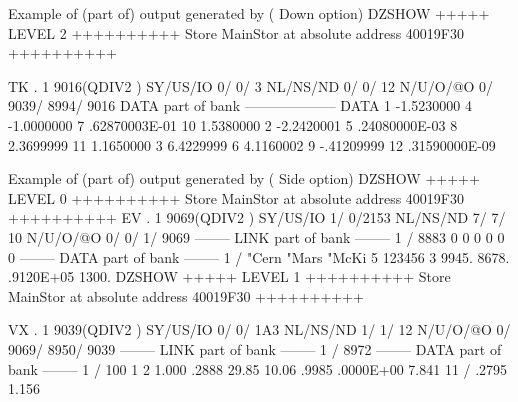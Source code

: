 \begin{landscapebody}
\begin{XMPt}{Example of (part of) output generated by  ( Down option)}
DZSHOW  +++++ LEVEL     2 ++++++++++            Store  MainStor at absolute address 40019F30      ++++++++++                     
                                                                                                                                 
 TK  .     1     9016(QDIV2   ) SY/US/IO    0/    0/   3 NL/NS/ND    0/    0/      12 N/U/O/@O       0/    9039/    8994/    9016
DATA part of bank                                         --------------------                                                   
DATA      1    -1.5230000         4    -1.0000000         7     .62870003E-01    10     1.5380000                                
          2    -2.2420001         5     .24080000E-03     8     2.3699999        11     1.1650000                                
          3     6.4229999         6     4.1160002         9    -.41209999        12     .31590000E-09                            
\end{XMPt}
\newpage
\mbox{}\vspace*{1cm}
\begin{XMPt}{Example of (part of) output generated by  ( Side option)}
DZSHOW  +++++ LEVEL     0 ++++++++++            Store  MainStor at absolute address 40019F30      ++++++++++                     
 EV  .     1     9069(QDIV2   ) SY/US/IO    1/    0/2153 NL/NS/ND    7/    7/      10 N/U/O/@O       0/       0/       1/    9069
--------  LINK part of bank  --------                                                                                            
      1 /        8883           0           0           0           0           0           0                                    
--------  DATA part of bank  --------                                                                                            
      1 /       "Cern       "Mars       "McKi           5      123456           3   9945.       8678.       .9120E+05   1300.    
DZSHOW  +++++ LEVEL     1 ++++++++++            Store  MainStor at absolute address 40019F30      ++++++++++                     
                                                                                                                                 
 VX  .     1     9039(QDIV2   ) SY/US/IO    0/    0/ 1A3 NL/NS/ND    1/    1/      12 N/U/O/@O       0/    9069/    8950/    9039
--------  LINK part of bank  --------                                                                                            
      1 /        8972                                                                                                            
--------  DATA part of bank  --------                                                                                            
      1 /         100           1           2   1.000       .2888       29.85       10.06       .9985       .0000E+00   7.841    
     11 /   .2795       1.156                                                                                                    
                                                                                                                                 

\end{XMPt}
\end{landscapebody}
